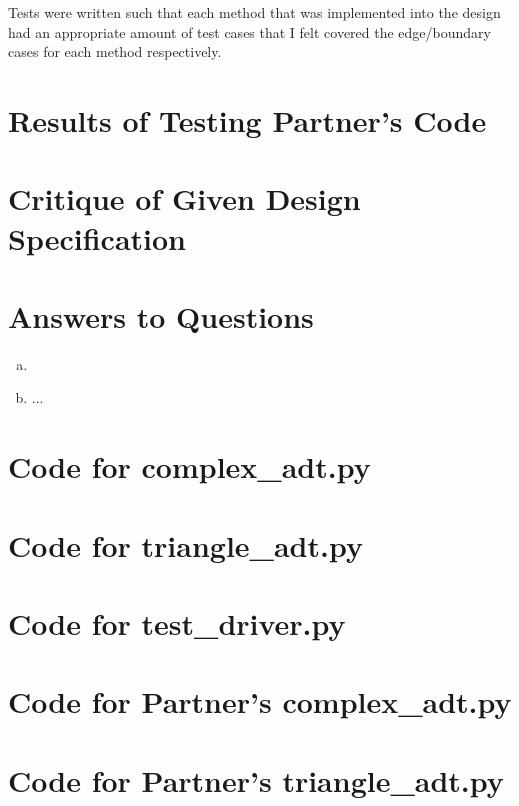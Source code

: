 \documentclass[12pt]{article}
\begin{document}
Tests were written such that each method that was implemented into the design
had an appropriate amount of test cases that I felt covered the edge/boundary 
cases for each method respectively. 

\section{Results of Testing Partner's Code}


\section{Critique of Given Design Specification}


\section{Answers to Questions}

\begin{enumerate}[(a)]

\item 
\item ...

\end{enumerate}

\newpage

\lstset{language=Python, basicstyle=\tiny, breaklines=true, showspaces=false,
  showstringspaces=false, breakatwhitespace=true}

\def\thesection{\Alph{section}}

\section{Code for complex\_adt.py}

\noindent 

\newpage

\section{Code for triangle\_adt.py}

\noindent 

\newpage

\section{Code for test\_driver.py}

\noindent 

\newpage

\section{Code for Partner's complex\_adt.py}

\noindent 

\section{Code for Partner's triangle\_adt.py}

\noindent 
\end{document}
